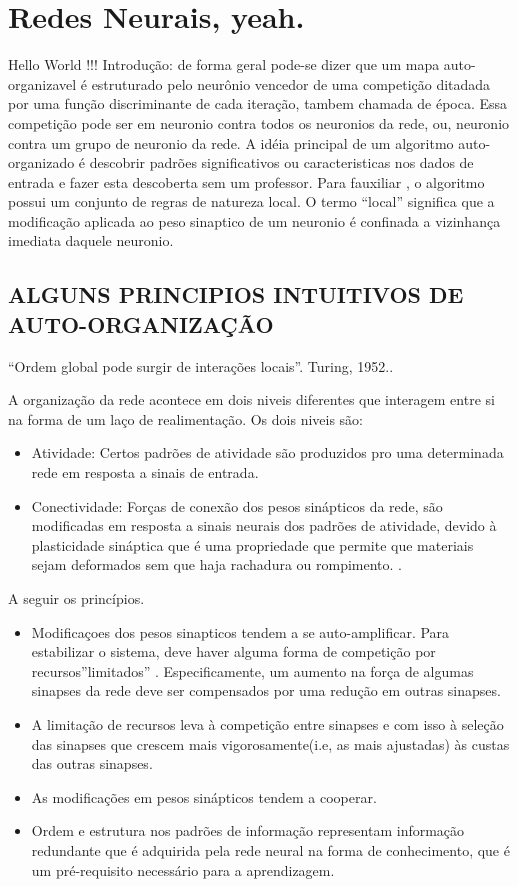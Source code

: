 \chapter{Redes Neurais, yeah.}
\quad Hello World !!!
\quad Introdução: de forma geral pode-se dizer que um mapa auto-organizavel é estruturado pelo neurônio vencedor de uma competição ditadada por uma função discriminante de cada iteração, tambem chamada de época. Essa competição pode ser em neuronio contra todos os neuronios da rede, ou, neuronio contra um grupo de neuronio da rede. A idéia principal de um algoritmo auto-organizado é descobrir padrões significativos ou caracteristicas nos dados de entrada e fazer esta descoberta  sem um professor. Para fauxiliar , o algoritmo possui um conjunto de regras de natureza local. O termo “local” significa que a modificação aplicada ao peso sinaptico de um neuronio é confinada a vizinhança imediata daquele neuronio.

\section { ALGUNS PRINCIPIOS INTUITIVOS DE AUTO-ORGANIZAÇÃO}

\quad “Ordem global pode surgir de interações locais”. Turing, 1952..

	A organização da rede acontece em dois niveis diferentes que interagem entre si na forma de um laço de realimentação. Os dois niveis são:
\begin{itemize}
\item  Atividade: Certos padrões de atividade são produzidos pro uma determinada rede em resposta a sinais de entrada.
\item Conectividade: Forças de conexão dos pesos sinápticos da rede, são modificadas em resposta a sinais neurais dos padrões de atividade, devido à plasticidade sináptica que é uma propriedade que permite que materiais sejam deformados sem que haja rachadura ou rompimento. .
\end{itemize}
A seguir os princípios.
\begin{itemize}
\item  Modificaçoes dos pesos  sinapticos tendem a se auto-amplificar.
	Para estabilizar o sistema, deve haver alguma forma de competição por recursos”limitados” . Especificamente, um aumento na força de algumas sinapses da rede deve ser compensados por uma redução em outras sinapses.
\item  A limitação de recursos leva à competição entre sinapses e com isso à seleção das sinapses  que crescem mais vigorosamente(i.e, as mais ajustadas) às custas das outras sinapses.
\item As modificações em pesos sinápticos tendem a cooperar.
\item Ordem e estrutura nos padrões de informação representam informação redundante que é adquirida pela rede neural na forma de conhecimento, que é um pré-requisito necessário para a aprendizagem.
\end{itemize}

